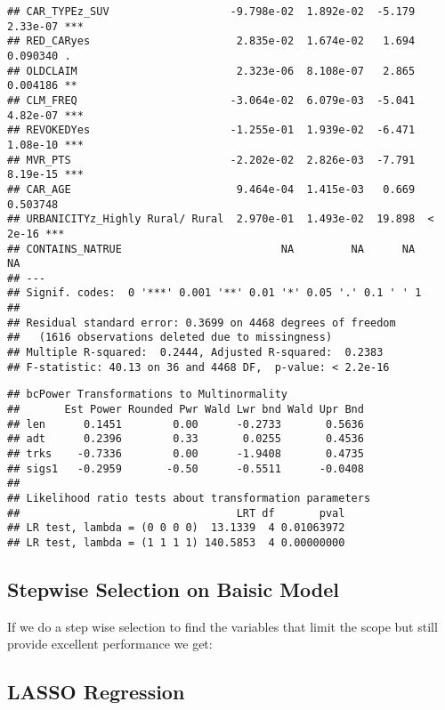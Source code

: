 \documentclass[]{article}
\begin{document}
\begin{verbatim}
## CAR_TYPEz_SUV                   -9.798e-02  1.892e-02  -5.179 2.33e-07 ***
## RED_CARyes                       2.835e-02  1.674e-02   1.694 0.090340 .  
## OLDCLAIM                         2.323e-06  8.108e-07   2.865 0.004186 ** 
## CLM_FREQ                        -3.064e-02  6.079e-03  -5.041 4.82e-07 ***
## REVOKEDYes                      -1.255e-01  1.939e-02  -6.471 1.08e-10 ***
## MVR_PTS                         -2.202e-02  2.826e-03  -7.791 8.19e-15 ***
## CAR_AGE                          9.464e-04  1.415e-03   0.669 0.503748    
## URBANICITYz_Highly Rural/ Rural  2.970e-01  1.493e-02  19.898  < 2e-16 ***
## CONTAINS_NATRUE                         NA         NA      NA       NA    
## ---
## Signif. codes:  0 '***' 0.001 '**' 0.01 '*' 0.05 '.' 0.1 ' ' 1
## 
## Residual standard error: 0.3699 on 4468 degrees of freedom
##   (1616 observations deleted due to missingness)
## Multiple R-squared:  0.2444, Adjusted R-squared:  0.2383 
## F-statistic: 40.13 on 36 and 4468 DF,  p-value: < 2.2e-16
\end{verbatim}

\begin{verbatim}
## bcPower Transformations to Multinormality 
##       Est Power Rounded Pwr Wald Lwr bnd Wald Upr Bnd
## len      0.1451        0.00      -0.2733       0.5636
## adt      0.2396        0.33       0.0255       0.4536
## trks    -0.7336        0.00      -1.9408       0.4735
## sigs1   -0.2959       -0.50      -0.5511      -0.0408
## 
## Likelihood ratio tests about transformation parameters
##                                  LRT df       pval
## LR test, lambda = (0 0 0 0)  13.1339  4 0.01063972
## LR test, lambda = (1 1 1 1) 140.5853  4 0.00000000
\end{verbatim}

\hypertarget{stepwise-selection-on-baisic-model}{%
\subsection{Stepwise Selection on Baisic
Model}\label{stepwise-selection-on-baisic-model}}

If we do a step wise selection to find the variables that limit the
scope but still provide excellent performance we get:

\hypertarget{lasso-regression}{%
\subsection{LASSO Regression}\label{lasso-regression}}
\end{document}
